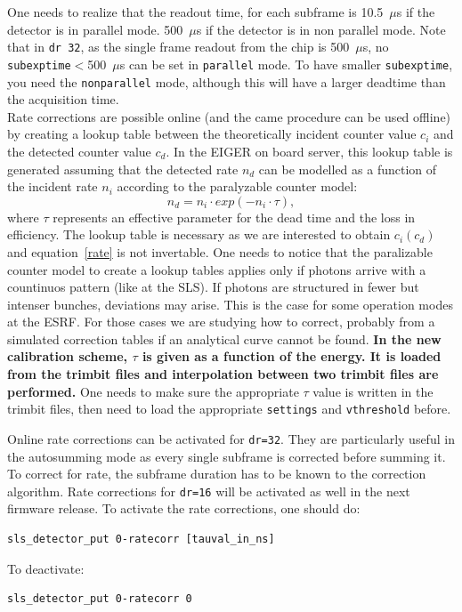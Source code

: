 \documentclass{article}
\begin{document}
One needs to realize that the readout time, for each subframe is 10.5~$\mu$s if the detector is in parallel mode. 500~$\mu$s if the detector is in non parallel mode. Note that in {\tt{dr 32}}, as the single frame readout from the chip is 500~$\mu$s, no {\tt{subexptime}}$<$500~$\mu$s can be set in {\tt{parallel}} mode. To have smaller {\tt{subexptime}}, you need the {\tt{nonparallel}} mode, although this will have a larger deadtime than the acquisition time.\\

Rate corrections are possible online (and the came procedure can be used offline) by creating a lookup table between the theoretically incident counter value $c_i$ and the detected counter value $c_d$. 
In the EIGER on board server, this lookup table is generated assuming that the detected rate $n_d$ can be modelled as a function of the incident rate $n_i$ according to the paralyzable counter model:
\begin{equation}
n_d= n_i \cdot exp(-n_i \cdot \tau),
\label{rate}
\end{equation}
where $\tau$ represents an effective parameter for the dead time and the loss in efficiency. The lookup table is necessary as we are interested to obtain $c_i(c_d)$ and equation~\ref{rate} is not invertable. One needs to notice that the paralizable counter model to create a lookup tables applies only if photons arrive with a countinuos pattern (like at the SLS). If photons are structured in fewer but intenser bunches, deviations may arise. This is the case for some operation modes at the ESRF. For those cases we are studying how to correct, probably from a simulated correction tables if an analytical curve cannot be found.  
\textbf{In the new calibration scheme, $\tau$ is given as a function of the energy. It is loaded from the trimbit files and interpolation between two trimbit files are performed.} One needs to make sure the appropriate $\tau$ value is written in the trimbit files, then need to load the appropriate {\tt{settings}} and {\tt{vthreshold}} before.

Online rate corrections can be activated for {\tt{dr=32}}. They are particularly useful in the autosumming mode as  every single subframe is corrected before summing it. To correct for rate, the subframe duration has to be known to the correction algorithm. Rate corrections for {\tt{dr=16}} will be activated as well in the next firmware release.     
To activate the rate corrections, one should do:\\
\begin{verbatim}
sls_detector_put 0-ratecorr [tauval_in_ns]
\end{verbatim}
To deactivate:
\begin{verbatim}
sls_detector_put 0-ratecorr 0
\end{verbatim}
\end{document}
